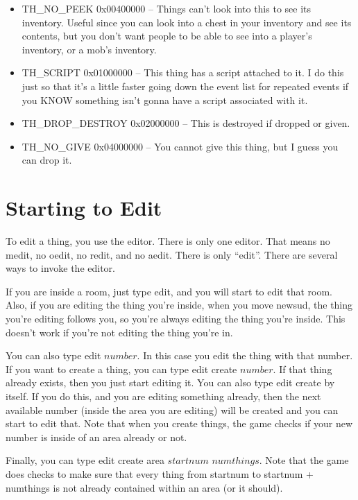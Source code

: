 \begin{itemize}
\item TH\_NO\_PEEK          0x00400000   -- Things can't look into this to see its inventory. Useful since you can look into a chest in your inventory and see its contents, but you don't want people to be able to see into a player's inventory, or a mob's inventory.

\item TH\_SCRIPT           0x01000000   -- This thing has a script  attached to it. I do this just so that it's a little faster going down the event list for repeated events if you KNOW something isn't gonna have a script associated with it.

\item TH\_DROP\_DESTROY     0x02000000   -- This is destroyed if dropped or
  given. 

\item TH\_NO\_GIVE          0x04000000   -- You cannot give this thing, but I guess you can drop it.

\end{itemize}



\section{Starting to Edit}

To edit a thing, you use the editor. There is only one editor. That
means no medit, no oedit, no redit, and no aedit. There is only
``edit''. There are several ways to invoke the editor.

If you are inside a room, just type edit, and you will start to edit
that room. Also, if you are editing the thing you're inside, when you
move newsud, the thing you're editing follows you, so you're always
editing the thing you're inside. This doesn't work if you're not
editing the thing you're in.

You can also type edit $number$. In this case you edit the thing with
that number. If you want to create a thing, you can type edit create
$number$. If that thing already exists, then you just start editing
it. You can also type edit create by itself. If you do this, and you
are editing something already, then the next available number (inside
the area you are editing) will be created and you can start to edit
that. Note that when you create things, the game checks if your new
number is inside of an area already or not.

Finally, you can type edit create area $startnum$ $numthings$. Note
that the game does checks to make sure that every thing from startnum
to startnum + numthings is not already contained within an area (or it
should).

